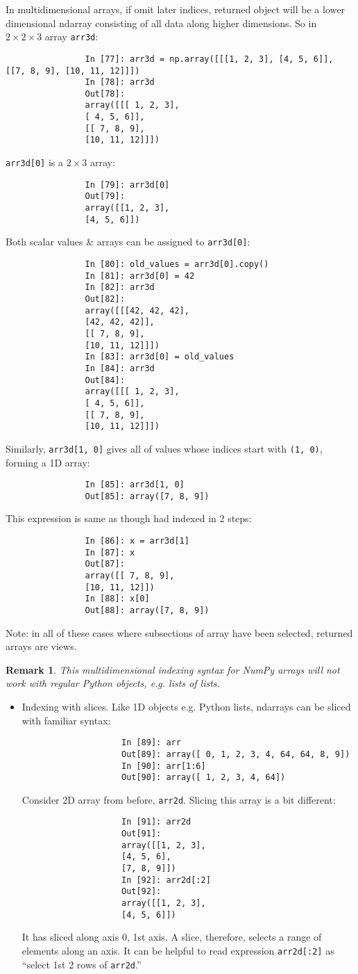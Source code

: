 \documentclass{article}
\newtheorem{remark}{Remark}
\begin{document}
\begin{itemize}
\begin{itemize}
\begin{itemize}
			In multidimensional arrays, if omit later indices, returned object will be a lower dimensional ndarray consisting of all data along higher dimensions. So in $2\times2\times3$ array {\tt arr3d}:
			\begin{verbatim}
				In [77]: arr3d = np.array([[[1, 2, 3], [4, 5, 6]], [[7, 8, 9], [10, 11, 12]]])
				In [78]: arr3d
				Out[78]:
				array([[[ 1, 2, 3],
				[ 4, 5, 6]],
				[[ 7, 8, 9],
				[10, 11, 12]]])
			\end{verbatim}
			{\tt arr3d[0]} is a $2\times3$ array:
			\begin{verbatim}
				In [79]: arr3d[0]
				Out[79]:
				array([[1, 2, 3],
				[4, 5, 6]])
			\end{verbatim}
			Both scalar values \& arrays can be assigned to {\tt arr3d[0]}:
			\begin{verbatim}
				In [80]: old_values = arr3d[0].copy()
				In [81]: arr3d[0] = 42
				In [82]: arr3d
				Out[82]:
				array([[[42, 42, 42],
				[42, 42, 42]],
				[[ 7, 8, 9],
				[10, 11, 12]]])
				In [83]: arr3d[0] = old_values
				In [84]: arr3d
				Out[84]:
				array([[[ 1, 2, 3],
				[ 4, 5, 6]],
				[[ 7, 8, 9],
				[10, 11, 12]]])
			\end{verbatim}
			Similarly, {\tt arr3d[1, 0]} gives all of values whose indices start with {\tt(1, 0)}, forming a 1D array:
			\begin{verbatim}
				In [85]: arr3d[1, 0]
				Out[85]: array([7, 8, 9])
			\end{verbatim}
			This expression is same as though had indexed in 2 steps:
			\begin{verbatim}
				In [86]: x = arr3d[1]
				In [87]: x
				Out[87]:
				array([[ 7, 8, 9],
				[10, 11, 12]])
				In [88]: x[0]
				Out[88]: array([7, 8, 9])
			\end{verbatim}
			Note: in all of these cases where subsections of array have been selected, returned arrays are views.
			\begin{remark}
				This multidimensional indexing syntax for NumPy arrays will not work with regular Python objects, e.g. lists of lists.
			\end{remark}
			\begin{itemize}
				\item {\sf Indexing with slices.} Like 1D objects e.g. Python lists, ndarrays can be sliced with familiar syntax:
				\begin{verbatim}
					In [89]: arr
					Out[89]: array([ 0, 1, 2, 3, 4, 64, 64, 8, 9])
					In [90]: arr[1:6]
					Out[90]: array([ 1, 2, 3, 4, 64])
				\end{verbatim}
				Consider 2D array from before, {\tt arr2d}. Slicing this array is a bit different:
				\begin{verbatim}
					In [91]: arr2d
					Out[91]:
					array([[1, 2, 3],
					[4, 5, 6],
					[7, 8, 9]])
					In [92]: arr2d[:2]
					Out[92]:
					array([[1, 2, 3],
					[4, 5, 6]])
				\end{verbatim}
				It has sliced along axis 0, 1st axis. A slice, therefore, selects a range of elements along an axis. It can be helpful to read expression {\tt arr2d[:2]} as ``select 1st 2 rows of {\tt arr2d}.''
				

\end{itemize}
\end{itemize}
\end{itemize}
\end{itemize}
\end{document}
